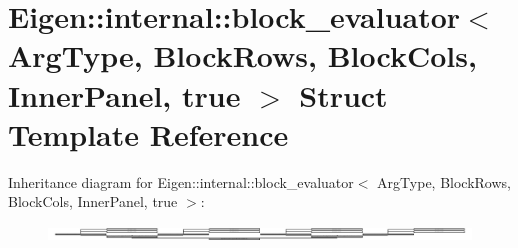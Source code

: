\hypertarget{struct_eigen_1_1internal_1_1block__evaluator_3_01_arg_type_00_01_block_rows_00_01_block_cols_00_01_inner_panel_00_01true_01_4}{}\section{Eigen\+:\+:internal\+:\+:block\+\_\+evaluator$<$ Arg\+Type, Block\+Rows, Block\+Cols, Inner\+Panel, true $>$ Struct Template Reference}
\label{struct_eigen_1_1internal_1_1block__evaluator_3_01_arg_type_00_01_block_rows_00_01_block_cols_00_01_inner_panel_00_01true_01_4}
Inheritance diagram for Eigen\+:\+:internal\+:\+:block\+\_\+evaluator$<$ Arg\+Type, Block\+Rows, Block\+Cols, Inner\+Panel, true $>$\+:\begin{figure}[H]
\begin{center}
\leavevmode
\includegraphics[height=0.373134cm]{struct_eigen_1_1internal_1_1block__evaluator_3_01_arg_type_00_01_block_rows_00_01_block_cols_00_01_inner_panel_00_01true_01_4}
\end{center}
\end{figure}
